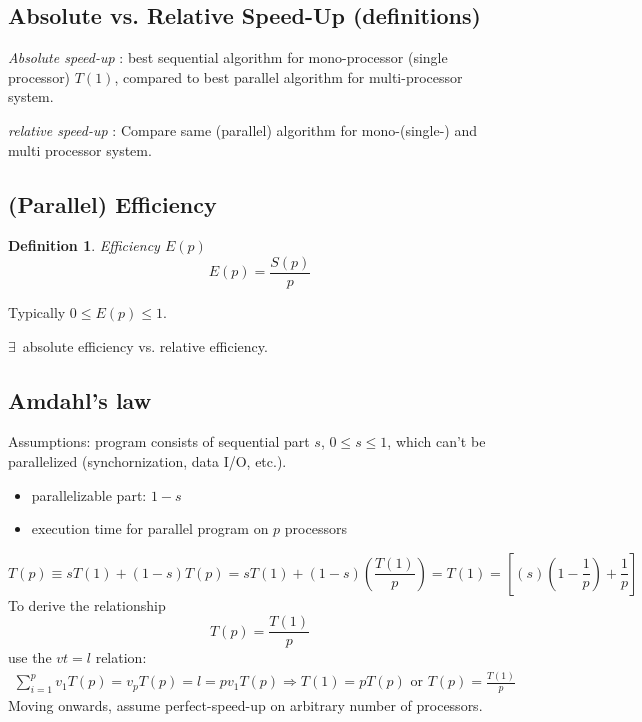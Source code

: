 \documentclass[10pt]{amsart}
\newtheorem{definition}{Definition}
\begin{document}
\begin{multicols*}{2}
\subsection{Absolute vs. Relative Speed-Up (definitions)}

\emph{Absolute speed-up} : best sequential algorithm for mono-processor (single processor) $T(1)$, compared to best parallel algorithm for multi-processor system.  

\emph{relative speed-up} : Compare same (parallel) algorithm for mono-(single-) and multi processor system.  

\subsection{(Parallel) Efficiency}

\begin{definition}
	Efficiency $E(p)$
	\begin{equation}
	E(p) = \frac{S(p)}{p}
	\end{equation}
\end{definition}
Typically $0\leq E(p) \leq 1$.  

$\exists \, $ absolute efficiency vs. relative efficiency.  

\subsection{Amdahl's law}

Assumptions: program consists of sequential part $s$, $0\leq s \leq 1$, which can't be parallelized (synchornization, data I/O, etc.).  

\begin{itemize}
	\item parallelizable part: $1-s$  
	\item execution time for parallel program on $p$ processors
\end{itemize}
\begin{equation}
T(p) \equiv s T(1) + (1-s) T(p) = sT(1) + (1-s) \left( \frac{T(1)}{p} \right) = T(1) = \left[ (s) \left( 1 - \frac{1}{p} \right) + \frac{1}{p} \right]
\end{equation}
To derive the relationship
\begin{equation}
T(p) = \frac{T(1)}{p}
\end{equation}
use the $vt=l$ relation:
\[
\begin{gathered}
\sum_{i=1}^p v_1 T(p) = v_p T(p) = l = pv_1T(p) \Longrightarrow T(1) = pT(p) \text{ or } T(p) = \frac{T(1)}{p}
\end{gathered}
\]
Moving onwards, assume perfect-speed-up on arbitrary number of processors.  


\end{multicols*}
\end{document}

